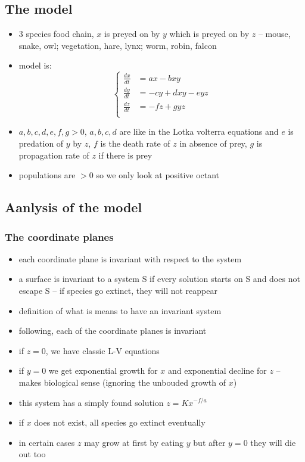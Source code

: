 \documentclass[a4paper,reqno,11pt]{article}
\begin{document}
\subsection{The model}

\begin{itemize}
    \item 3 species food chain, $x$ is preyed on by $y$ which is preyed on by
        $z$ -- mouse, snake, owl; vegetation, hare, lynx; worm, robin, falcon
    \item model is:
        \begin{equation}\nonumber
            \left\{\begin{aligned}
                \frac{dx}{dt}&= ax - bxy \\
                \frac{dy}{dt}&= -cy + dxy - eyz \\
                \frac{dz}{dt}&= -fz + gyz \\
            \end{aligned}\right.
        \end{equation}
    \item $a,b,c,d,e,f,g > 0$, $a,b,c,d$ are like in the Lotka volterra
        equations and $e$ is predation of $y$ by $z$, $f$ is the death rate of
        $z$ in absence of prey, $g$ is propagation rate of $z$ if there is prey
    \item populations are $>0$ so we only look at positive octant
\end{itemize}

\subsection{Aanlysis of the model}

\subsubsection{The coordinate planes}

\begin{itemize}
    \item each coordinate plane is invariant with respect to the system
    \item a surface is invariant to a system S if every solution starts on
        S and does not escape S -- if species go extinct, they will not
        reappear
    \item definition of what is means to have an invariant system
    \item following, each of the coordinate planes is invariant
    \item if $z=0$, we have classic L-V equations
    \item if $y=0$ we get exponential growth for $x$ and exponential decline
        for $z$ -- makes biological sense (ignoring the unbouded growth of $x$)
    \item this system has a simply found solution $z = Kx^{-f/a}$
    \item if $x$ does not exist, all species go extinct eventually
    \item in certain cases $z$ may grow at first by eating $y$ but after $y=0$
        they will die out too
\end{itemize}
\end{document}
